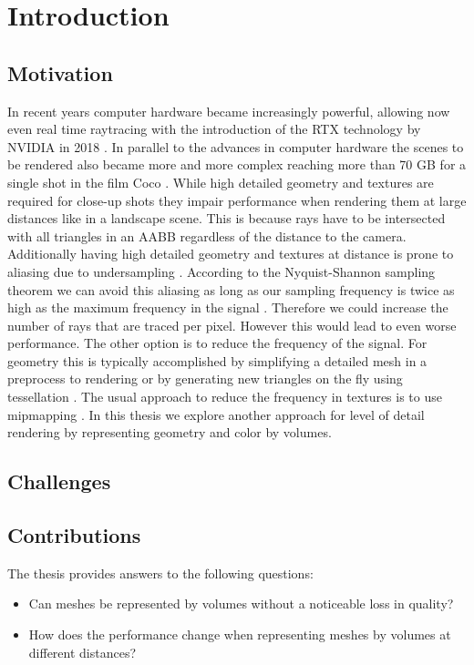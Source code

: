 \chapter{Introduction}
\label{chap:intro}

\section{Motivation}
\label{sect:motivation}
In recent years computer hardware became increasingly powerful, allowing now even real time raytracing with the introduction of the RTX technology by NVIDIA in 2018 \cite[pp. 31 - 38]{turing_whitepaper}.
In parallel to the advances in computer hardware the scenes to be rendered also became more and more complex reaching more than 70 GB for a single shot in the film Coco \cite{pixarxpu}.
While high detailed geometry and textures are required for close-up shots they impair performance when rendering them at large distances like in a landscape scene.
This is because rays have to be intersected with all triangles in an AABB regardless of the distance to the camera.
Additionally having high detailed geometry and textures at distance is prone to aliasing due to undersampling \cite[pp. 409-410]{pbr}.
According to the Nyquist-Shannon sampling theorem we can avoid this aliasing as long as our sampling frequency is twice as high as the maximum frequency in the signal \cite[p. 11]{shannonsampling}.
Therefore we could increase the number of rays that are traced per pixel.
However this would lead to even worse performance.
The other option is to reduce the frequency of the signal.
For geometry this is typically accomplished by simplifying a detailed mesh in a preprocess to rendering \cite[pp. 706 - 712]{realtime} or by generating new triangles on the fly using tessellation \cite[pp. 767 - 781]{realtime}.
The usual approach to reduce the frequency in textures is to use mipmapping \cite[pp. 265 - 267]{fundamentals}.
In this thesis we explore another approach for level of detail rendering by representing geometry and color by volumes.

\section{Challenges}


\section{Contributions}
The thesis provides answers to the following questions:
\begin{itemize}
	\item Can meshes be represented by volumes without a noticeable loss in quality?
	\item How does the performance change when representing meshes by volumes at different distances?
\end{itemize}
